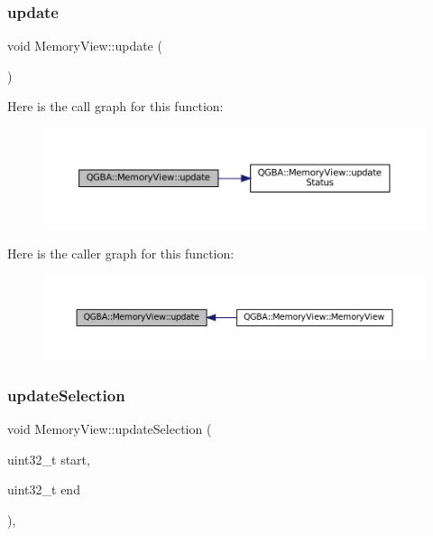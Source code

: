 \subsubsection{\texorpdfstring{update}{update}}
{\footnotesize\ttfamily void Memory\+View\+::update (\begin{DoxyParamCaption}{ }\end{DoxyParamCaption})\hspace{0.3cm}{\ttfamily [slot]}}

Here is the call graph for this function\+:
\nopagebreak
\begin{figure}[H]
\begin{center}
\leavevmode
\includegraphics[width=350pt]{class_q_g_b_a_1_1_memory_view_a7f782144cc93b71df28e9806c0c91ee8_cgraph}
\end{center}
\end{figure}
Here is the caller graph for this function\+:
\nopagebreak
\begin{figure}[H]
\begin{center}
\leavevmode
\includegraphics[width=350pt]{class_q_g_b_a_1_1_memory_view_a7f782144cc93b71df28e9806c0c91ee8_icgraph}
\end{center}
\end{figure}
\mbox{\label{class_q_g_b_a_1_1_memory_view_a03e597889e524eda48b0b3c89a23737c}} 
\subsubsection{\texorpdfstring{update\+Selection}{updateSelection}}
{\footnotesize\ttfamily void Memory\+View\+::update\+Selection (\begin{DoxyParamCaption}\item[{uint32\+\_\+t}]{start,  }\item[{uint32\+\_\+t}]{end }\end{DoxyParamCaption})\hspace{0.3cm}{\ttfamily [private]}, {\ttfamily [slot]}}

